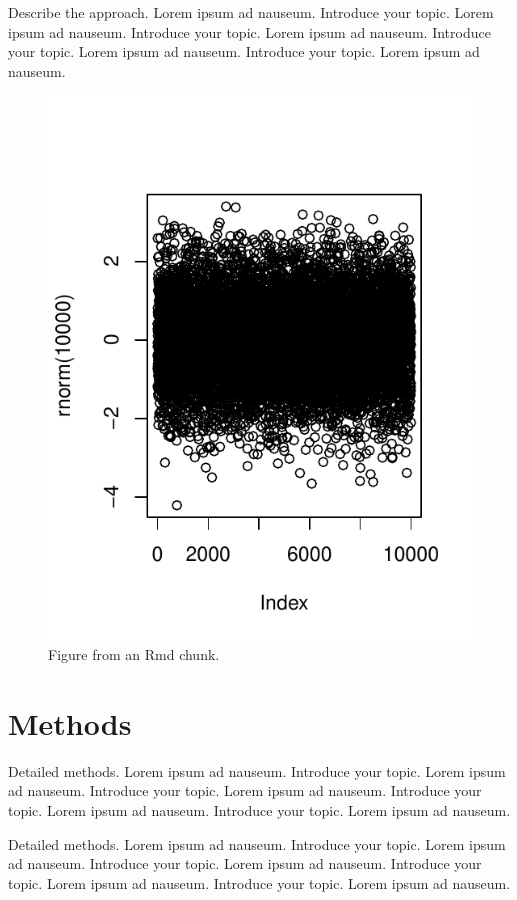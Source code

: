 \documentclass{bioinfo}
\begin{document}
Describe the approach. Lorem ipsum ad nauseum. Introduce your topic.
Lorem ipsum ad nauseum. Introduce your topic. Lorem ipsum ad nauseum.
Introduce your topic. Lorem ipsum ad nauseum. Introduce your topic.
Lorem ipsum ad nauseum.

\begin{figure}
\centering
\includegraphics{Untitled_files/figure-latex/figure-1.pdf}
\caption{Figure from an Rmd chunk.}
\end{figure}

\section{Methods}

Detailed methods. Lorem ipsum ad nauseum. Introduce your topic. Lorem
ipsum ad nauseum. Introduce your topic. Lorem ipsum ad nauseum.
Introduce your topic. Lorem ipsum ad nauseum. Introduce your topic.
Lorem ipsum ad nauseum.

Detailed methods. Lorem ipsum ad nauseum. Introduce your topic. Lorem
ipsum ad nauseum. Introduce your topic. Lorem ipsum ad nauseum.
Introduce your topic. Lorem ipsum ad nauseum. Introduce your topic.
Lorem ipsum ad nauseum.
\end{document}
